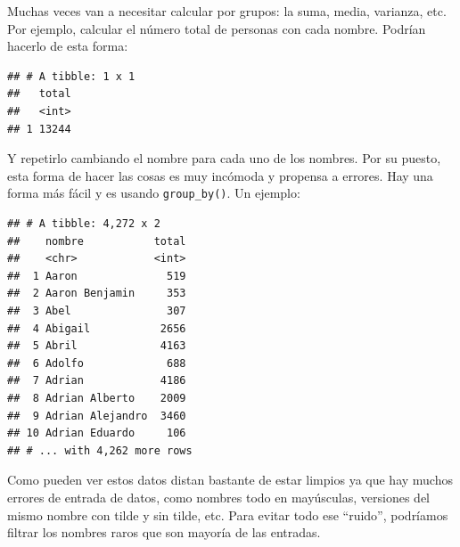 \documentclass[]{book}
\newenvironment{Shaded}{\begin{snugshade}}{\end{snugshade}}
\newcommand{\CommentTok}[1]{\textcolor[rgb]{0.56,0.35,0.01}{\textit{#1}}}
\newcommand{\DataTypeTok}[1]{\textcolor[rgb]{0.13,0.29,0.53}{#1}}
\newcommand{\KeywordTok}[1]{\textcolor[rgb]{0.13,0.29,0.53}{\textbf{#1}}}
\newcommand{\NormalTok}[1]{#1}
\newcommand{\OperatorTok}[1]{\textcolor[rgb]{0.81,0.36,0.00}{\textbf{#1}}}
\newcommand{\StringTok}[1]{\textcolor[rgb]{0.31,0.60,0.02}{#1}}
\theoremstyle{definition}
\theoremstyle{definition}
\theoremstyle{definition}
\theoremstyle{remark}
\begin{document}
Muchas veces van a necesitar calcular por grupos: la suma, media,
varianza, etc. Por ejemplo, calcular el número total de personas con
cada nombre. Podrían hacerlo de esta forma:

\begin{Shaded}
\end{Shaded}

\begin{verbatim}
## # A tibble: 1 x 1
##   total
##   <int>
## 1 13244
\end{verbatim}

Y repetirlo cambiando el nombre para cada uno de los nombres. Por su
puesto, esta forma de hacer las cosas es muy incómoda y propensa a
errores. Hay una forma más fácil y es usando \texttt{group\_by()}. Un
ejemplo:

\begin{Shaded}
\end{Shaded}

\begin{verbatim}
## # A tibble: 4,272 x 2
##    nombre           total
##    <chr>            <int>
##  1 Aaron              519
##  2 Aaron Benjamin     353
##  3 Abel               307
##  4 Abigail           2656
##  5 Abril             4163
##  6 Adolfo             688
##  7 Adrian            4186
##  8 Adrian Alberto    2009
##  9 Adrian Alejandro  3460
## 10 Adrian Eduardo     106
## # ... with 4,262 more rows
\end{verbatim}

Como pueden ver estos datos distan bastante de estar limpios ya que hay
muchos errores de entrada de datos, como nombres todo en mayúsculas,
versiones del mismo nombre con tilde y sin tilde, etc. Para evitar todo
ese ``ruido'', podríamos filtrar los nombres raros que son mayoría de
las entradas.
\end{document}
